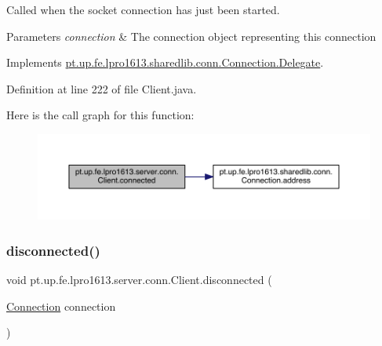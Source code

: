 Called when the socket connection has just been started.


\begin{DoxyParams}{Parameters}
{\em connection} & The connection object representing this connection \\
\hline
\end{DoxyParams}


Implements \hyperlink{interfacept_1_1up_1_1fe_1_1lpro1613_1_1sharedlib_1_1conn_1_1_connection_1_1_delegate_afeb3c54ced46916733df2ba0b0e2d87e}{pt.\+up.\+fe.\+lpro1613.\+sharedlib.\+conn.\+Connection.\+Delegate}.



Definition at line 222 of file Client.\+java.

Here is the call graph for this function\+:
\nopagebreak
\begin{figure}[H]
\begin{center}
\leavevmode
\includegraphics[width=350pt]{classpt_1_1up_1_1fe_1_1lpro1613_1_1server_1_1conn_1_1_client_a1cf160e68d7310d9f0b3a53d8b26f80d_cgraph}
\end{center}
\end{figure}
\hypertarget{classpt_1_1up_1_1fe_1_1lpro1613_1_1server_1_1conn_1_1_client_a8aaec34bb1c5d5af0430318b105ac3fc}{}\label{classpt_1_1up_1_1fe_1_1lpro1613_1_1server_1_1conn_1_1_client_a8aaec34bb1c5d5af0430318b105ac3fc} 
\subsubsection{\texorpdfstring{disconnected()}{disconnected()}}
{\footnotesize\ttfamily void pt.\+up.\+fe.\+lpro1613.\+server.\+conn.\+Client.\+disconnected (\begin{DoxyParamCaption}\item[{\hyperlink{classpt_1_1up_1_1fe_1_1lpro1613_1_1sharedlib_1_1conn_1_1_connection}{Connection}}]{connection }\end{DoxyParamCaption})}

